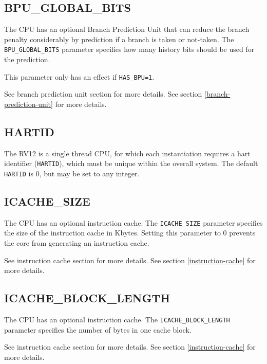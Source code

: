 \subsection{BPU\_GLOBAL\_BITS}\label{bpu_global_bits}

The CPU has an optional Branch Prediction Unit that can reduce the branch
penalty considerably by prediction if a branch is taken or not-taken. The
\texttt{BPU\_GLOBAL\_BITS} parameter specifies how many history bits should be
used for the prediction.

This parameter only has an effect if \texttt{HAS\_BPU=1}.

\ifdefined\MARKDOWN
See branch prediction unit section for more details.
\else
See section \ref{branch-prediction-unit}  for more details.
\fi

\subsection{HARTID}\label{hartid}

The RV12 is a single thread CPU, for which each instantiation requires a hart
identifier (\texttt{HARTID}), which must be unique within the overall system.
The default \texttt{HARTID} is 0, but may be set to any integer.

\subsection{ICACHE\_SIZE}\label{icache_size}

The CPU has an optional instruction cache. The \texttt{ICACHE\_SIZE} parameter
specifies the size of the instruction cache in Kbytes. Setting this parameter to
0 prevents the core from generating an instruction cache.

\ifdefined\MARKDOWN
See instruction cache section for more details.
\else
See section \ref{instruction-cache}  for more details.
\fi


\subsection{ICACHE\_BLOCK\_LENGTH}\label{icache_block_length}

The CPU has an optional instruction cache. The \texttt{ICACHE\_BLOCK\_LENGTH}
parameter specifies the number of bytes in one cache block.

\ifdefined\MARKDOWN
See instruction cache section for more details.
\else
See section \ref{instruction-cache}  for more details.
\fi

